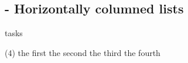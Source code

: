 
\subsection{ - Horizontally columned lists}

\begin{demo}{}{tasks}
	\begin{tasks}(4)
		\task the first
		\task the second
		\task the third
		\task the fourth
	\end{tasks}
\end{demo}
